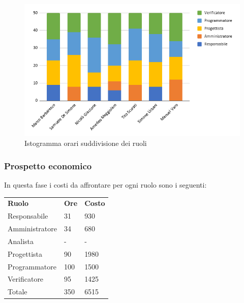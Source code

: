         \begin{figure}[!h]
            \caption{Istogramma orari suddivisione dei ruoli}
            \vspace{5px}
            \includegraphics[scale=0.6]{../../../Images/Diagrammi/Istogrammi/ore codifica.png}
            \centering
        \end{figure}
    \subsubsection{Prospetto economico}
    In questa fase i costi da affrontare per ogni ruolo sono i seguenti:
        \begin{center}
            \begin{table}[ht!]
                \centering
                \renewcommand{\arraystretch}{1.8}
                \begin{tabular}{p{75px} p{20px} p{30px}}
                    \rowcolor{logo!70} \textbf{Ruolo} & \textbf{Ore} & \textbf{Costo}\\
                    Responsabile & 31 & 930 \\
                    Amministratore & 34 & 680 \\
                    Analista & - & - \\
                    Progettista & 90 & 1980 \\
                    Programmatore & 100 & 1500 \\
                    Verificatore & 95 & 1425  \\
                    Totale & 350 & 6515 \\
                \end{tabular}
            \end{table}
        \end{center}
        \pagebreak
            
